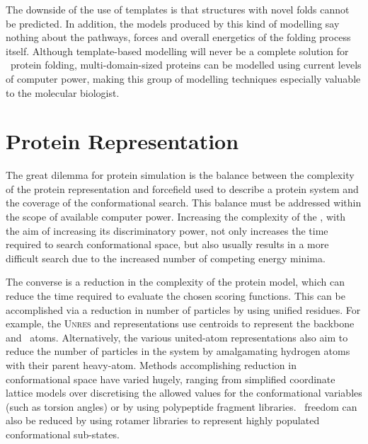 The downside of the use of templates is that structures with novel folds
cannot be predicted. In addition, the models produced by this kind of modelling
say nothing about the pathways, forces and overall energetics of the folding
process itself.
Although template-based modelling will never be a complete solution for \insilico\ protein folding, multi-domain-sized proteins can be modelled using current levels of computer power, making this group of modelling techniques especially
valuable to the molecular biologist.









\section{Protein Representation}
\label{section:protein_rep}

The great dilemma for protein simulation is the balance between the complexity of the protein representation and forcefield used to describe a protein system and the coverage of the conformational search. This balance must be addressed within the scope of available computer power.
Increasing the complexity of the \forcefield, with the aim of increasing its discriminatory power, not only increases the time required to search conformational space, but also usually results in a more difficult search due to the increased number of competing
energy minima. 


The converse is a reduction in the complexity of the protein model, which can reduce the time required to evaluate the chosen scoring functions. This can be accomplished via a reduction in number of particles by using unified residues. For example, the \textsc{Unres}\cite{COMPCHEM:Cza2004,COMPCHEM:Liw97} and \raft\cite{COMPCHEM:Gib2001} representations use centroids to represent the backbone and \sidechain\ atoms. Alternatively, the various \mbox{united-atom}\cite{COMPCHEM:Der99,COMPCHEM:Osg99} representations also aim to reduce the number of particles in the system by amalgamating hydrogen atoms with their parent heavy-atom. Methods accomplishing reduction in conformational space have varied hugely, ranging from simplified coordinate lattice models\cite{COMPCHEM:Hin92,COMPCHEM:Hin94,COMPCHEM:Kol94,COMPCHEM:Cov94} over discretising the allowed values for the conformational variables (such as torsion angles\cite{COMPCHEM:Gib2001}) or by using polypeptide fragment libraries\cite{METHOD:Rosetta,METHOD:Rosetta:CASP3}. \Sidechain\ freedom can also be reduced by using rotamer libraries to represent highly populated conformational sub-states.

